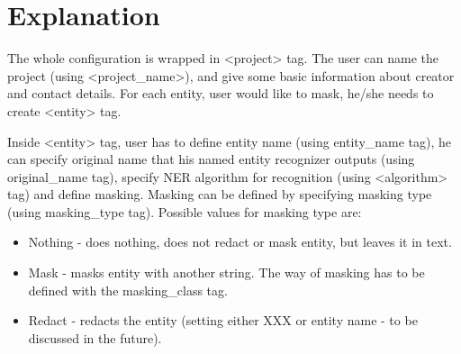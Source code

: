 \documentclass[letterpaper,10pt,english]{sphinxmanual}
\begin{document}
\begin{sphinxVerbatim}[commandchars=\\\{\}]
\end{sphinxVerbatim}


\section{Explanation}
\label{\detokenize{contents:explanation}}
The whole configuration is wrapped in \textless{}project\textgreater{} tag. The user can name the project (using \textless{}project\_name\textgreater{}), and give some basic information about creator and contact details. For each entity, user would like to mask, he/she needs to create \textless{}entity\textgreater{} tag.

Inside \textless{}entity\textgreater{} tag, user has to define entity name (using entity\_name tag), he can specify original name that his named entity recognizer outputs (using original\_name tag), specify NER algorithm for recognition (using \textless{}algorithm\textgreater{} tag) and define masking. Masking can be defined by specifying masking type (using masking\_type tag). Possible values for masking type are:
\begin{itemize}
\item {} 
Nothing - does nothing, does not redact or mask entity, but leaves it in text.

\item {} 
Mask - masks entity with another string. The way of masking has to be defined with the masking\_class tag.

\item {} 
Redact - redacts the entity (setting either XXX or entity name - to be discussed in the future).

\end{itemize}
\end{document}
